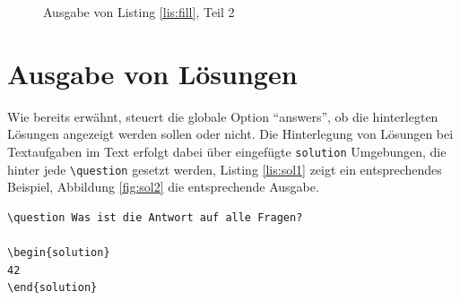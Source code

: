 \begin{figure}
\caption{Ausgabe von Listing \ref{lis:fill}, Teil 2}\label{fig:fill2}
\end{figure}

\section{Ausgabe von Lösungen}

Wie bereits erwähnt, steuert die globale Option \enquote{answers}, ob die hinterlegten Lösungen angezeigt werden sollen oder nicht. Die Hinterlegung von Lösungen bei Textaufgaben im Text erfolgt dabei über eingefügte \texttt{solution} Umgebungen, die hinter jede \texttt{\textbackslash question} gesetzt werden, Listing \ref{lis:sol1} zeigt ein entsprechendes Beispiel, Abbildung \ref{fig:sol2} die entsprechende Ausgabe.

\begin{lstlisting}[label={lis:sol1},caption={Beispielhafte Lösung}]
\question Was ist die Antwort auf alle Fragen?

\begin{solution}
42
\end{solution}
\end{lstlisting}


